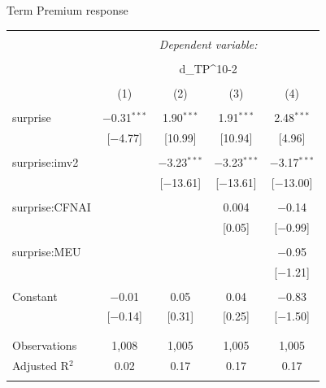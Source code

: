 \documentclass{beamer}
\begin{document}
\begin{frame}{Term Premium response}
\scriptsize
\begin{table}[!htbp] \centering 
{\renewcommand{\arraystretch}{1}
\begin{tabular}{@{\extracolsep{5pt}}lcccc} 
\\[-1.8ex]\hline 
\hline \\[-1.8ex] 
 & \multicolumn{4}{c}{\textit{Dependent variable:}} \\ 
\cline{2-5} 
\\[-1.8ex] & \multicolumn{4}{c}{d\_TP^{10-2}} \\ 
\\[-1.8ex] & (1) & (2) & (3) & (4)\\ 
\hline \\[-1.8ex] 
 surprise & $-$0.31$^{***}$ & 1.90$^{***}$ & 1.91$^{***}$ & 2.48$^{***}$ \\ 
  & [$-$4.77] & [10.99] & [10.94] & [4.96] \\ 
  & & & & \\ 
 surprise:imv2 &  & $-$3.23$^{***}$ & $-$3.23$^{***}$ & $-$3.17$^{***}$ \\ 
  &  & [$-$13.61] & [$-$13.61] & [$-$13.00] \\ 
  & & & & \\ 
 surprise:CFNAI &  &  & 0.004 & $-$0.14 \\ 
  &  &  & [0.05] & [$-$0.99] \\ 
  & & & & \\ 
 surprise:MEU &  &  &  & $-$0.95 \\ 
  &  &  &  & [$-$1.21] \\ 
  & & & & \\ 
 Constant & $-$0.01 & 0.05 & 0.04 & $-$0.83 \\ 
  & [$-$0.14] & [0.31] & [0.25] & [$-$1.50] \\ 
  & & & & \\ 
\hline \\[-1.8ex] 
Observations & 1,008 & 1,005 & 1,005 & 1,005 \\ 
Adjusted R$^{2}$ & 0.02 & 0.17 & 0.17 & 0.17 \\ 
\hline 
\hline \\[-1.8ex] 
\end{tabular} }
\end{table}
\end{frame}
\end{document}
